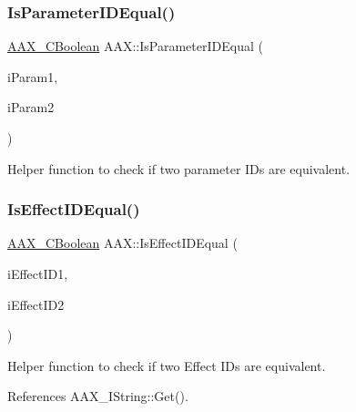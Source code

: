 \subsubsection{\texorpdfstring{IsParameterIDEqual()}{IsParameterIDEqual()}}
{\footnotesize\ttfamily \mbox{\hyperlink{a00392_aa216506530f1d19a2965931ced2b274b}{A\+A\+X\+\_\+\+C\+Boolean}} A\+A\+X\+::\+Is\+Parameter\+I\+D\+Equal (\begin{DoxyParamCaption}\item[{\mbox{\hyperlink{a00392_a1440c756fe5cb158b78193b2fc1780d1}{A\+A\+X\+\_\+\+C\+Param\+ID}}}]{i\+Param1,  }\item[{\mbox{\hyperlink{a00392_a1440c756fe5cb158b78193b2fc1780d1}{A\+A\+X\+\_\+\+C\+Param\+ID}}}]{i\+Param2 }\end{DoxyParamCaption})\hspace{0.3cm}{\ttfamily [inline]}}



Helper function to check if two parameter I\+Ds are equivalent. 

\mbox{\label{a00852_aef81989128dcac01f2be8fd25096540f}} 
\subsubsection{\texorpdfstring{IsEffectIDEqual()}{IsEffectIDEqual()}}
{\footnotesize\ttfamily \mbox{\hyperlink{a00392_aa216506530f1d19a2965931ced2b274b}{A\+A\+X\+\_\+\+C\+Boolean}} A\+A\+X\+::\+Is\+Effect\+I\+D\+Equal (\begin{DoxyParamCaption}\item[{const \mbox{\hyperlink{a01873}{A\+A\+X\+\_\+\+I\+String}} $\ast$}]{i\+Effect\+I\+D1,  }\item[{const \mbox{\hyperlink{a01873}{A\+A\+X\+\_\+\+I\+String}} $\ast$}]{i\+Effect\+I\+D2 }\end{DoxyParamCaption})\hspace{0.3cm}{\ttfamily [inline]}}



Helper function to check if two Effect I\+Ds are equivalent. 



References A\+A\+X\+\_\+\+I\+String\+::\+Get().


